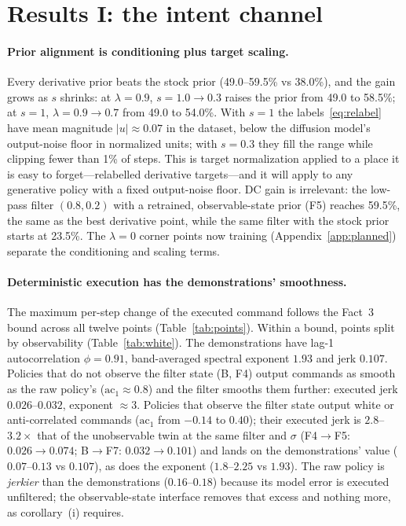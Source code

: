 \documentclass{article}
\begin{document}
\section{Results I: the intent channel}
\label{sec:intent}

\paragraph{Prior alignment is conditioning plus target scaling.} Every derivative prior beats the stock prior (49.0--59.5\% vs 38.0\%), and the gain grows as $s$ shrinks: at $\lambda=0.9$, $s=1.0\to0.3$ raises the prior from 49.0 to 58.5\%; at $s=1$, $\lambda=0.9\to0.7$ from 49.0 to 54.0\%. With $s=1$ the labels~\eqref{eq:relabel} have mean magnitude $|u|\approx0.07$ in the dataset, below the diffusion model's output-noise floor in normalized units; with $s=0.3$ they fill the range while clipping fewer than 1\% of steps. This is target normalization applied to a place it is easy to forget---relabelled derivative targets---and it will apply to any generative policy with a fixed output-noise floor. DC gain is irrelevant: the low-pass filter $(0.8,0.2)$ with a retrained, observable-state prior (F5) reaches 59.5\%, the same as the best derivative point, while the same filter with the stock prior starts at 23.5\%. The $\lambda=0$ corner points now training (Appendix~\ref{app:planned}) separate the conditioning and scaling terms.

\paragraph{Deterministic execution has the demonstrations' smoothness.} The maximum per-step change of the executed command follows the Fact~3 bound across all twelve points (Table~\ref{tab:points}). Within a bound, points split by observability (Table~\ref{tab:white}). The demonstrations have lag-1 autocorrelation $\phi=0.91$, band-averaged spectral exponent $1.93$ and jerk $0.107$. Policies that do not observe the filter state (B, F4) output commands as smooth as the raw policy's ($\mathrm{ac}_1\approx0.8$) and the filter smooths them further: executed jerk $0.026$--$0.032$, exponent $\approx3$. Policies that observe the filter state output white or anti-correlated commands ($\mathrm{ac}_1$ from $-0.14$ to $0.40$); their executed jerk is $2.8$--$3.2\times$ that of the unobservable twin at the same filter and $\sigma$ (F4$\to$F5: $0.026\to0.074$; B$\to$F7: $0.032\to0.101$) and lands on the demonstrations' value ($0.07$--$0.13$ vs $0.107$), as does the exponent ($1.8$--$2.25$ vs $1.93$). The raw policy is \emph{jerkier} than the demonstrations ($0.16$--$0.18$) because its model error is executed unfiltered; the observable-state interface removes that excess and nothing more, as corollary~(i) requires.
\end{document}
